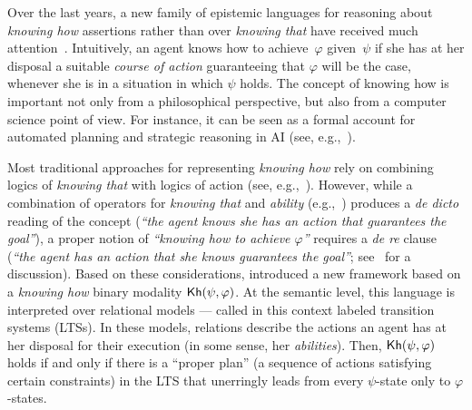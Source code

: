 Over the last years, a new family of epistemic languages for reasoning about \emph{knowing how} assertions rather than over \emph{knowing that} have received much attention~\cite{Pavese22}. Intuitively, an agent knows how to achieve~$\varphi$ given~$\psi$ if she has at her disposal a suitable \emph{course of action} guaranteeing that $\varphi$ will be the case, whenever she is in a situation in which $\psi$ holds. The concept of knowing how is important not only from a philosophical perspective, but also from a computer science point of view. For instance, it can be seen as a formal account for automated planning and strategic reasoning in AI (see, e.g.,~\cite{KandA15}).

Most traditional approaches for representing \emph{knowing how} rely on combining logics of \emph{knowing that} with logics of action (see,
e.g.,~\cite{Mccarthy69,Les00,HerzigT06}). However,
while a combination of operators for \emph{knowing that} and \emph{ability} (e.g.,~\cite{wiebeetal:2003}) produces a \emph{de dicto} reading of the concept (\emph{``the agent knows she has an action that guarantees the goal''}), a proper notion of \emph{``knowing how to achieve $\varphi$''} requires a \emph{de re} clause (\emph{``the agent has an action that she knows guarantees the goal''}; see~\cite{JamrogaA07,Herzig15} for a discussion).
Based on these considerations, \cite{Wang15lori,Wang2016} introduced
a new framework based on a \emph{knowing how} binary modality
${\sf Kh}(\psi,\varphi)$. At the semantic level, this language is interpreted over relational models --- called in this context labeled transition systems (LTSs).
In these models, relations describe the actions an
agent has at her disposal for their execution (in some sense, her \emph{abilities}).
Then,
${\sf Kh}(\psi,\varphi)$ holds if and only if there is a ``proper plan'' (a sequence of
actions satisfying certain constraints) in the LTS that
unerringly leads from every $\psi$-state only to $\varphi$-states.

